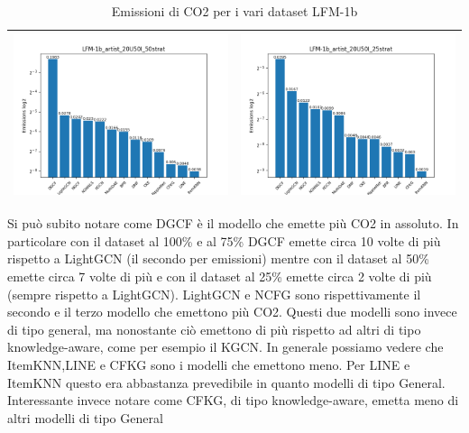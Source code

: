 \begin{table}[H]
\begin{tabularx}{\textwidth}{|X|X|}
        \hline
        \includegraphics[width=\linewidth, trim=0 0 0 0]{images/emissions_LFM-1b_artist_20U50I_50strat.png} &
        \includegraphics[width=\linewidth, trim=0 0 0 0]{images/emissions_LFM-1b_artist_20U50I_25strat.png} \\
        \hline
    \end{tabularx}
    \caption{Emissioni di CO2 per i vari dataset LFM-1b}
    \label{tab:emissions_info}
\end{table}

\noindent Si può subito notare come DGCF è il modello che emette più CO2 in assoluto.
In particolare con il dataset al 100\% e al 75\% DGCF emette circa 10 volte di più rispetto a LightGCN (il secondo per emissioni)
mentre con il dataset al 50\% emette circa 7 volte di più e con il dataset al 25\% emette circa 2 volte di più (sempre rispetto a LightGCN).
LightGCN e NCFG sono rispettivamente il secondo e il terzo modello che emettono più CO2.
Questi due modelli sono invece di tipo general, ma nonostante ciò emettono di più rispetto ad altri di tipo knowledge-aware, come per esempio il KGCN.
In generale possiamo vedere che ItemKNN,LINE e CFKG sono i modelli che emettono meno.
Per LINE e ItemKNN questo era abbastanza prevedibile in quanto modelli di tipo General. Interessante invece notare come CFKG, di tipo knowledge-aware, emetta meno di altri modelli di tipo General


